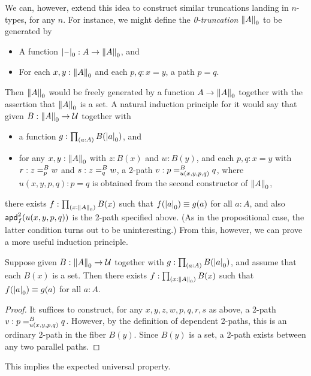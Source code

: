 %
We can, however, extend this idea to construct similar truncations landing in $n$-types, for any $n$.
For instance, we might define the \emph{0-trun\-ca\-tion} $\trunc0A$ to be generated by
\begin{itemize}
\item A function $\tprojf0 : A \to \trunc0 A$, and
\item For each $x,y:\trunc0A$ and each $p,q:x=y$, a path $p=q$.
\end{itemize}
Then $\trunc0A$ would be freely generated by a function $A\to \trunc0A$ together with the assertion that $\trunc0A$ is a set.
A natural induction principle for it would say that given $B:\trunc0 A \to \type$ together with
\begin{itemize}
\item a function $g:\prd{a:A} B(\tproj0a)$, and
\item for any $x,y:\trunc0A$ with $z:B(x)$ and $w:B(y)$, and each $p,q:x=y$ with $r:\dpath{B}{p}{z}{w}$ and $s:\dpath{B}{q}{z}{w}$, a 2-path $v:\dpath{B}{u(x,y,p,q)}{p}{q}$, where $u(x,y,p,q):p=q$ is obtained from the second constructor of $\trunc0A$,
\end{itemize}
there exists $f:\prd{x:\trunc0A} B(x)$ such that $f(\tproj0a)\jdeq g(a)$ for all $a:A$, and also $\apdtwo{f}{u(x,y,p,q)}$ is the 2-path specified above.
(As in the propositional case, the latter condition turns out to be uninteresting.)
From this, however, we can prove a more useful induction principle.

\begin{lem}\label{thm:trunc0-ind}
  Suppose given $B:\trunc0 A \to \type$ together with $g:\prd{a:A} B(\tproj0a)$, and assume that each $B(x)$ is a set.
  Then there exists $f:\prd{x:\trunc0A} B(x)$ such that $f(\tproj0a)\jdeq g(a)$ for all $a:A$.
\end{lem}
\begin{proof}
  It suffices to construct, for any $x,y,z,w,p,q,r,s$ as above, a 2-path $v:\dpath{B}{u(x,y,p,q)}{p}{q}$.
  However, by the definition of dependent 2-paths, this is an ordinary 2-path in the fiber $B(y)$.
  Since $B(y)$ is a set, a 2-path exists between any two parallel paths.
\end{proof}

This implies the expected universal property.


